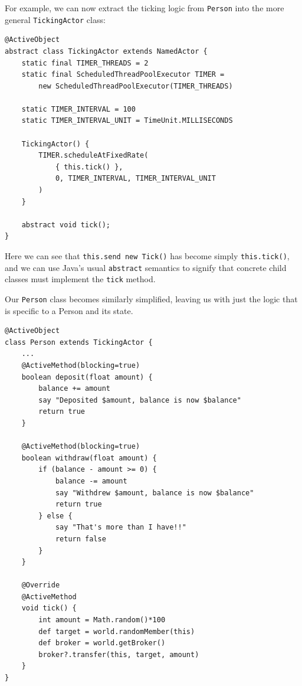 \documentclass[a4paper,12pt]{kth-mag}
\begin{document}
For example, we can now extract the ticking logic from \texttt{Person} into the more general \texttt{TickingActor} class:

\begin{listing}[H]
	\begin{verbatim}
@ActiveObject
abstract class TickingActor extends NamedActor {
    static final TIMER_THREADS = 2
    static final ScheduledThreadPoolExecutor TIMER = 
        new ScheduledThreadPoolExecutor(TIMER_THREADS)

    static TIMER_INTERVAL = 100
    static TIMER_INTERVAL_UNIT = TimeUnit.MILLISECONDS

    TickingActor() {
        TIMER.scheduleAtFixedRate(
            { this.tick() },
            0, TIMER_INTERVAL, TIMER_INTERVAL_UNIT
        )
    }

    abstract void tick();
}
	\end{verbatim}
\end{listing}	

Here we can see that \texttt{this.send new Tick()} has become simply \texttt{this.tick()}, and we can use Java's usual \texttt{abstract} semantics to signify that concrete child classes must implement the \texttt{tick} method.

Our \texttt{Person} class becomes similarly simplified, leaving us with just the logic that is specific to a Person and its state.

\begin{listing}[H]
	\begin{verbatim}
@ActiveObject
class Person extends TickingActor {
    ...
    @ActiveMethod(blocking=true)
    boolean deposit(float amount) {
        balance += amount
        say "Deposited $amount, balance is now $balance"
        return true
    }

    @ActiveMethod(blocking=true)
    boolean withdraw(float amount) {
        if (balance - amount >= 0) {
            balance -= amount
            say "Withdrew $amount, balance is now $balance"
            return true
        } else {
            say "That's more than I have!!"
            return false
        }
    }

    @Override
    @ActiveMethod
    void tick() {
        int amount = Math.random()*100
        def target = world.randomMember(this)
        def broker = world.getBroker()
        broker?.transfer(this, target, amount)
    }
}
	\end{verbatim}
\end{listing}	
\end{document}
